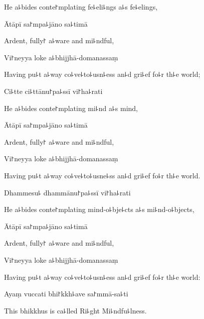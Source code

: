 \begin{english}
  He a꜕bides conte꜓mplating fe꜕eli꜕ngs a꜕s fe꜕elings,
\end{english}

Ātāpī sa꜓mpa꜕jāno sa꜕timā

\begin{english}
  Ardent, fully꜓ a꜕ware and mi꜕ndful,
\end{english}

Vi꜓neyya loke a꜕bhijjhā-domanassaṃ

\begin{english}
  Having pu꜕t a꜕way co꜕ve꜕to꜕usn꜕ess an꜕d gri꜕ef fo꜕r th꜕e world;
\end{english}

Ci꜕tte ci꜕ttānu꜓pa꜕ssī vi꜓ha꜕rati

\begin{english}
  He a꜕bides conte꜓mplating mi꜕nd a꜕s mind,
\end{english}

Ātāpī sa꜓mpa꜕jāno sa꜕timā

\begin{english}
  Ardent, fully꜓ a꜕ware and mi꜕ndful,
\end{english}

Vi꜓neyya loke a꜕bhijjhā-domanassaṃ

\begin{english}
  Having pu꜕t a꜕way co꜕ve꜕to꜕usne꜕ss an꜕d gri꜕ef fo꜕r th꜕e world.
\end{english}

Dhammesu꜕ dhammānu꜓pa꜕ssī vi꜓ha꜕rati

\begin{english}
  He a꜕bides conte꜓mplating mind-o꜕bje꜕cts a꜕s mi꜕nd-o꜕bjects,
\end{english}

Ātāpī sa꜓mpa꜕jāno sa꜕timā

\begin{english}
  Ardent, fully꜓ a꜕ware and mi꜕ndful,
\end{english}

Vi꜓neyya loke a꜕bhijjhā-domanassaṃ

\begin{english}
  Having pu꜕t a꜕way co꜕ve꜕to꜕usn꜕ess an꜕d gri꜕ef fo꜕r th꜕e world:
\end{english}

Ayaṃ vuccati bhi꜓kkh꜕ave sa꜓mmā-sa꜕ti

\begin{english}
  This bhikkhus is ca꜕lled Ri꜕ght Mi꜕ndfu꜕lness.
\end{english}

